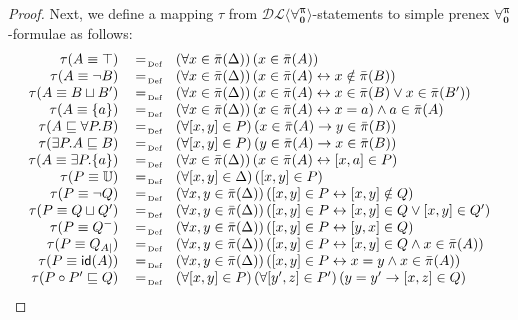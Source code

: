 \documentclass[a4paper,UKenglish]{lipics}
\newcommand{\Lang}{\ensuremath{\mathbf{\forall_{0}^{\pi}}}\xspace}
\newcommand{\nonpairs}[1]{\bar{\pi}(#1)}
\newcommand{\dlLang}{\ensuremath{\mathcal{DL\langle}\Lang\mathcal{\rangle}}\xspace}
\newcommand{\roleidentity}[1]{\mathsf{id}(#1)}
\newcommand{\universalrole}{\mathbb{U}}
\begin{document}
\begin{proof}
Next, we define a mapping $\tau$ from \dlLang-statements to simple
prenex \Lang-formulae as follows:
\[
 \begin{array}{rcl}
  \tau(A \equiv \top) & \defAs & \left(\forall x \in \nonpairs{\Delta}\right)\left(x \in \nonpairs{A}\right)\\
  \tau(A \equiv \neg B) & \defAs & \left(\forall x \in \nonpairs{\Delta}\right)\left(x \in \nonpairs{A} \leftrightarrow x \notin \nonpairs{B}\right)\\
  \tau(A \equiv B \sqcup B') & \defAs & \left(\forall x \in \nonpairs{\Delta}\right)\left(x \in \nonpairs{A} \leftrightarrow x \in \nonpairs{B} \vee x \in \nonpairs{B'}\right)\\
  \tau(A \equiv \{a\}) & \defAs & \left(\forall x \in \nonpairs{\Delta}\right)\left(x \in \nonpairs{A} \leftrightarrow x=a\right) \wedge a \in \nonpairs{A}\\
  \tau(A \Issub \forall P.B) & \defAs & \left(\forall [x,y] \in P\right)\left(x \in \nonpairs{A} \rightarrow y \in \nonpairs{B}\right)\\
  \tau(\exists P.A \Issub B) & \defAs & \left(\forall [x,y] \in P\right)\left(y \in \nonpairs{A} \rightarrow x \in \nonpairs{B}\right)\\
  \tau(A \equiv \exists P.\{a\}) & \defAs & \left(\forall x \in \nonpairs{\Delta}\right)\left(x \in \nonpairs{A} \leftrightarrow [x,a] \in P\right)\\
  \tau(P \equiv \universalrole) & \defAs & \left(\forall [x,y] \in \Delta\right)\left([x,y] \in P\right)\\
  \tau(P \equiv \neg Q) & \defAs & \left(\forall x,y \in \nonpairs{\Delta}\right)\left([x,y] \in P \leftrightarrow [x,y] \notin Q\right)\\
  \tau(P \equiv Q \sqcup Q') & \defAs & \left(\forall x,y \in \nonpairs{\Delta}\right)\left([x,y] \in P \leftrightarrow [x,y] \in Q \vee [x,y] \in Q'\right)\\
  \tau(P \equiv Q^{-}) & \defAs & \left(\forall x,y \in \nonpairs{\Delta}\right)\left([x,y] \in P \leftrightarrow [y,x] \in Q\right)\\
  \tau(P \equiv Q_{A|}) & \defAs & \left(\forall x,y \in \nonpairs{\Delta}\right)\left([x,y] \in P \leftrightarrow [x,y] \in Q \wedge x \in \nonpairs{A}\right)\\
  \tau(P \equiv \roleidentity{A}) & \defAs & \left(\forall x,y \in \nonpairs{\Delta}\right)\left([x,y] \in P \leftrightarrow x=y \wedge x \in \nonpairs{A}\right)\\
  \tau(P \circ P' \Issub Q) & \defAs & \left(\forall [x,y]\in P\right)\left(\forall [y',z] \in P'\right)\left(y=y' \rightarrow [x,z] \in Q\right)\\

\end{array}\]
\end{proof}
\end{document}
